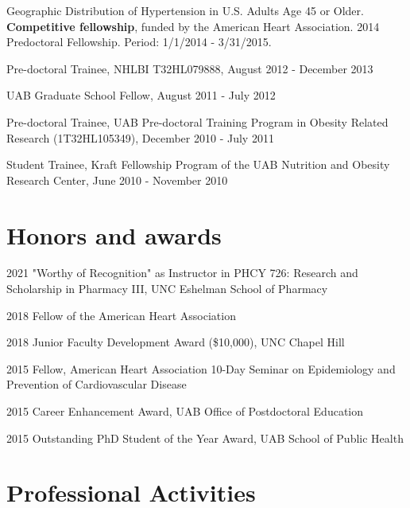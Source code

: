 \documentclass[10pt,letterpaper]{article}
\renewenvironment{itemize}{
  \begin{list}{}{
    \setlength{\leftmargin}{1.5em}
    \setlength{\itemsep}{0.25em}
    \setlength{\parskip}{0pt}
    \setlength{\parsep}{0.25em}
  }
}{
  \end{list}
}
\begin{document}
\begin{itemize}
	\item Geographic Distribution of Hypertension in U.S. Adults Age 45 or Older. \textbf{Competitive fellowship}, funded by the American Heart Association. 2014 Predoctoral Fellowship. Period: 1/1/2014 - 3/31/2015.\\
	
	\item Pre-doctoral Trainee, NHLBI T32HL079888, August 2012 - December 2013\\
	
	\item UAB Graduate School Fellow, August 2011 - July 2012\\
	
	\item Pre-doctoral Trainee, UAB Pre-doctoral Training Program in Obesity Related Research (1T32HL105349), December 2010 - July 2011\\
	
	\item Student Trainee, Kraft Fellowship Program of the UAB Nutrition and Obesity Research Center, June 2010 - November 2010
\end{itemize}

\section*{Honors and awards}
\begin{itemize}
    \item 2021 "Worthy of Recognition" as Instructor in PHCY 726: Research and Scholarship in Pharmacy III, UNC Eshelman School of Pharmacy
    \item 2018 Fellow of the American Heart Association
    \item 2018 Junior Faculty Development Award (\$10,000), UNC Chapel Hill
    \item 2015 Fellow, American Heart Association 10-Day Seminar on Epidemiology and Prevention of Cardiovascular Disease
	\item 2015 Career Enhancement Award, UAB Office of Postdoctoral Education 
	\item 2015 Outstanding PhD Student of the Year Award, UAB School of Public Health
\end{itemize}

\section*{Professional Activities}
\end{document}
